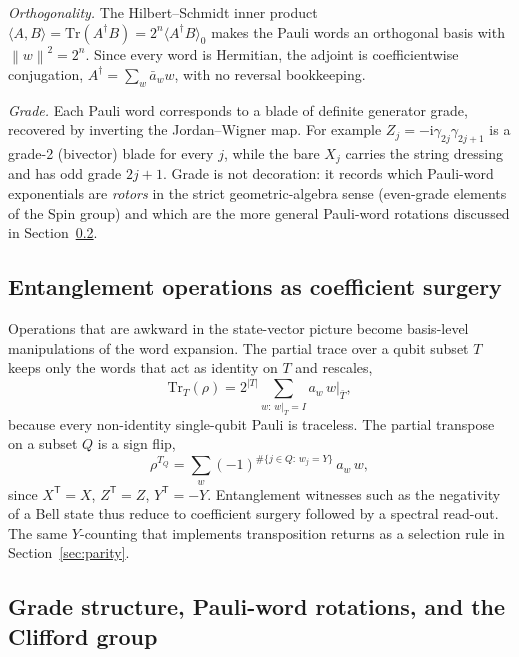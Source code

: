 \documentclass[11pt]{article}
\newcommand{\Tr}{\mathrm{Tr}}
\newcommand{\ii}{\mathrm{i}}
\newcommand{\norm}[1]{\left\lVert #1 \right\rVert}
\begin{document}
\emph{Orthogonality.}  The Hilbert--Schmidt inner product $\langle A,B\rangle=\Tr(A^\dagger B)=2^n\langle A^\dagger B\rangle_0$ makes the Pauli words an orthogonal basis with $\norm{w}^2=2^n$.  Since every word is Hermitian, the adjoint is coefficientwise conjugation, $A^\dagger=\sum_w \bar a_w w$, with no reversal bookkeeping.

\emph{Grade.}  Each Pauli word corresponds to a blade of definite generator grade, recovered by inverting the Jordan--Wigner map.  For example $Z_j=-\ii\gamma_{2j}\gamma_{2j+1}$ is a grade-2 (bivector) blade for every $j$, while the bare $X_j$ carries the string dressing and has odd grade $2j+1$.  Grade is not decoration: it records which Pauli-word exponentials are \emph{rotors} in the strict geometric-algebra sense (even-grade elements of the Spin group) and which are the more general Pauli-word rotations discussed in Section~\ref{sec:rotors}.

\subsection{Entanglement operations as coefficient surgery}

Operations that are awkward in the state-vector picture become basis-level manipulations of the word expansion.  The partial trace over a qubit subset $T$ keeps only the words that act as identity on $T$ and rescales,
\begin{equation}
    \Tr_T(\rho) = 2^{|T|}\sum_{w:\,w|_T=I} a_w\, w|_{\bar T},
\end{equation}
because every non-identity single-qubit Pauli is traceless.  The partial transpose on a subset $Q$ is a sign flip,
\begin{equation}
    \rho^{T_Q} = \sum_w (-1)^{\#\{j\in Q:\, w_j=Y\}}\, a_w\, w,
\end{equation}
since $X^{\mathsf T}=X$, $Z^{\mathsf T}=Z$, $Y^{\mathsf T}=-Y$.  Entanglement witnesses such as the negativity of a Bell state thus reduce to coefficient surgery followed by a spectral read-out.  The same $Y$-counting that implements transposition returns as a selection rule in Section~\ref{sec:parity}.

\subsection{Grade structure, Pauli-word rotations, and the Clifford group}
\label{sec:rotors}
\end{document}
